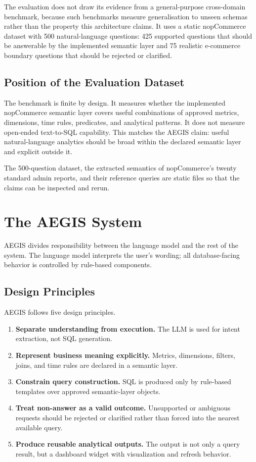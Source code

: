 \documentclass[pdflatex,sn-mathphys-num]{sn-jnl}
\begin{document}
The evaluation does not draw its evidence from a general-purpose cross-domain benchmark, because such benchmarks measure generalisation to unseen schemas rather than the property this architecture claims. It uses a static nopCommerce dataset with 500 natural-language questions: 425 supported questions that should be answerable by the implemented semantic layer and 75 realistic e-commerce boundary questions that should be rejected or clarified.


\subsection{Position of the Evaluation Dataset}

The benchmark is finite by design. It measures whether the implemented nopCommerce semantic layer covers useful combinations of approved metrics, dimensions, time rules, predicates, and analytical patterns. It does not measure open-ended text-to-SQL capability. This matches the AEGIS claim: useful natural-language analytics should be broad within the declared semantic layer and explicit outside it.


The 500-question dataset, the extracted semantics of nopCommerce's twenty standard admin reports, and their reference queries are static files so that the claims can be inspected and rerun.


\section{The AEGIS System}

AEGIS divides responsibility between the language model and the rest of the system. The language model interprets the user's wording; all database-facing behavior is controlled by rule-based components.


\subsection{Design Principles}

AEGIS follows five design principles.


\begin{enumerate}
\item \textbf{Separate understanding from execution.} The LLM is used for intent extraction, not SQL generation.
\item \textbf{Represent business meaning explicitly.} Metrics, dimensions, filters, joins, and time rules are declared in a semantic layer.
\item \textbf{Constrain query construction.} SQL is produced only by rule-based templates over approved semantic-layer objects.
\item \textbf{Treat non-answer as a valid outcome.} Unsupported or ambiguous requests should be rejected or clarified rather than forced into the nearest available query.
\item \textbf{Produce reusable analytical outputs.} The output is not only a query result, but a dashboard widget with visualization and refresh behavior.
\end{enumerate}
\end{document}
